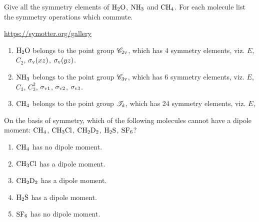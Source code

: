 \documentclass[a4paper]{book}
\begin{document}
	\setcounter{chapter}{2}

	\begin{exercise}
		Give all the symmetry elements of $\ce{H2O}$, $\ce{NH3}$ and $\ce{CH4}$. For each molecule list the symmetry operations which commute.
	\end{exercise}

	\begin{solution}
		\url{https://symotter.org/gallery}
		\begin{enumerate}[label=(\alph*)]
		
		\item $\ce{H2O}$ belongs to the point group $\mathscr{C}_{\rm 2v}$, which has 4 symmetry elements, viz. $E$, $C_2$, $\sigma_{\rm v}(xz)$, $\sigma_{\rm v}(yz)$.
		
		\item $\ce{NH3}$ belongs to the point group $\mathscr{C}_{\rm 3v}$, which has 6 symmetry elements, viz. $E$, $C_3$, $C^2_3$, $\sigma_{\rm v1}$, $\sigma_{\rm v2}$, $\sigma_{\rm v3}$.
		
		\item $\ce{CH4}$ belongs to the point group $\mathscr{T}_{\rm d}$, which has 24 symmetry elements, viz. $E$, 
		
		\end{enumerate}
		
	\end{solution}
	
	\begin{exercise}
		On the basis of symmetry, which of the following molecules cannot have a dipole moment: $\ce{CH4}$, $\ce{CH3Cl}$, $\ce{CH2D2}$, $\ce{H2S}$, $\ce{SF6}$?
	\end{exercise}

	\begin{solution}
	
		\begin{enumerate}[label=(\alph*)]
		
		\item $\ce{CH4}$ has no dipole moment.
		
		\item $\ce{CH3Cl}$ has a dipole moment.
		
		\item $\ce{CH2D2}$ has a dipole moment.
		
		\item $\ce{H2S}$ has a dipole moment.
		
		\item $\ce{SF6}$ has no dipole moment.
		
		\end{enumerate}

	\end{solution}
\end{document}
